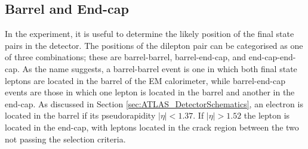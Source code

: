 \documentclass{article}
\begin{document}
\subsection{Barrel and End-cap}
\label{sec:MCA_barrelEndcap}

In the experiment, it is useful to determine the likely position of the final state pairs in the detector. The positions of the dilepton pair can be categorised as one of three combinations; these are barrel-barrel, barrel-end-cap, and end-cap-end-cap. As the name suggests, a barrel-barrel event is one in which both final state leptons are located in the barrel of the EM calorimeter, while barrel-end-cap events are those in which one lepton is located in the barrel and another in the end-cap. As discussed in Section \ref{sec:ATLAS_DetectorSchematics}, an electron is located in the barrel if its pseudorapidity $|\eta|<1.37$. If $|\eta|>1.52$ the lepton is located in the end-cap, with leptons located in the crack region between the two not passing the selection criteria.
\end{document}
